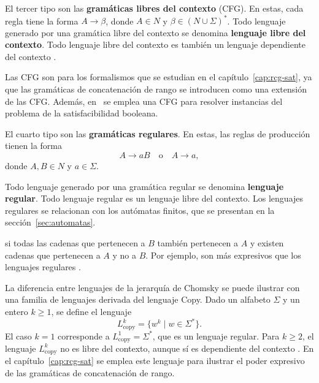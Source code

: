 \documentclass{report}
\theoremstyle{definition}
\theoremstyle{plain}
\theoremstyle{remark}
\begin{document}
El tercer tipo son las \textbf{gramáticas libres del contexto} (CFG).  En estas, cada regla tiene la forma $A \to \beta$, donde $A \in N$ y $\beta \in (N \cup \Sigma)^*$. Todo lenguaje generado por una gramática libre del contexto se denomina \textbf{lenguaje libre del contexto}.  Todo lenguaje libre del contexto es también un lenguaje dependiente del contexto \agregaesto{[REF]}.

Las CFG son  para los formalismos que se estudian en el capítulo~\ref{cap:rcg-sat}, ya que las gramáticas de concatenación de rango se introducen como una extensión de las CFG. Además, en~\cite{fernandez2007sat} se emplea una CFG para resolver instancias del problema de la satisfacibilidad booleana.

El cuarto tipo son las \textbf{gramáticas regulares}. En estas, las reglas de producción tienen la forma
\[
  A \to aB \quad \text{o} \quad A \to a,
\]
donde $A, B \in N$ y $a \in \Sigma$. 

Todo lenguaje generado por una gramática regular se denomina \textbf{lenguaje regular}. Todo lenguaje regular es un lenguaje libre del contexto. Los lenguajes regulares se relacionan con los autómatas finitos, que se presentan en la sección~\ref{sec:automatas}.

 si todas las cadenas que pertenecen a $B$ también pertenecen a $A$ y existen cadenas que pertenecen a $A$ y no a $B$. Por ejemplo,  son más expresivos que los lenguajes regulares \cite{hopcroft2006introduction}.

La diferencia entre  lenguajes de la jerarquía de Chomsky se puede ilustrar con una familia de lenguajes derivada del lenguaje Copy. Dado un alfabeto $\Sigma$ y un entero $k \ge 1$, se define el lenguaje
\[
  L_{\mathrm{copy}}^k = \{ w^k \mid w \in \Sigma^* \}.
\]
El caso $k = 1$ corresponde a $L_{\mathrm{copy}}^1 = \Sigma^*$, que es
un lenguaje regular. Para $k \ge 2$, el lenguaje $L_{\mathrm{copy}}^k$
no es libre del contexto, aunque sí es dependiente del contexto
\cite{hopcroft2006introduction}. En el capítulo~\ref{cap:rcg-sat} se
emplea este lenguaje para ilustrar el poder expresivo de las gramáticas
de concatenación de rango.
\end{document}
